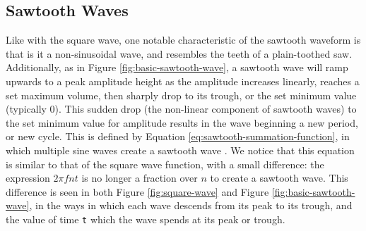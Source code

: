 

\subsection{Sawtooth Waves}
Like with the square wave, one notable characteristic of the sawtooth waveform is that is it a non-sinusoidal wave, and resembles the teeth of a plain-toothed saw. Additionally, as in Figure \ref{fig:basic-sawtooth-wave}, a sawtooth wave will ramp upwards to a peak amplitude height as the amplitude increases linearly, reaches a set maximum volume, then sharply drop to its trough, or the set minimum value (typically 0). This sudden drop (the non-linear component of sawtooth waves) to the set minimum value for amplitude results in the wave beginning a new period, or new cycle. This is defined by Equation \ref{eq:sawtooth-summation-function}, in which multiple sine waves create a sawtooth wave \cite{Tarr_2019}. We notice that this equation is similar to that of the square wave function, with a small difference: the expression $2\pi fnt$ is no longer a fraction over $n$ to create a sawtooth wave. This difference is seen in both Figure \ref{fig:square-wave} and Figure \ref{fig:basic-sawtooth-wave}, in the ways in which each wave descends from its peak to its trough, and the value of time \texttt{t} which the wave spends at its peak or trough.

